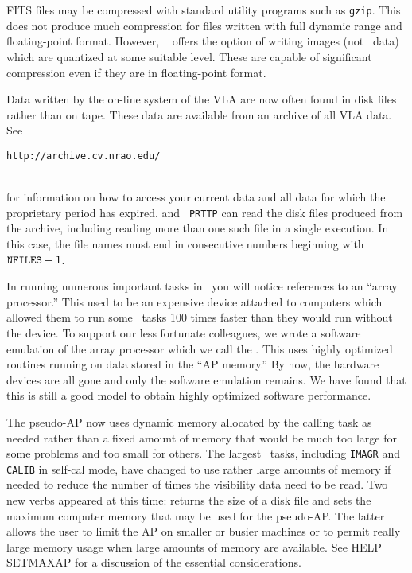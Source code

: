 FITS files may be compressed with standard utility programs such as
{\tt gzip}.  This does not produce much compression for files written
with full dynamic range and floating-point format.  However, {\tt
{}} offers the option of writing images (not \uv\ data)
which are quantized at some suitable level.  These are capable of
significant compression even if they are in floating-point format.


Data written by the on-line system of the VLA are now often found in
disk files rather than on tape.  These data are available from an
archive of all VLA data.  See \\
\centerline{{\tt http://archive.cv.nrao.edu/}}\\
for information on how to access your current data and all data for
which the proprietary period has expired.  {\tt {}} and {\tt
PRTTP} can read the disk files produced from the archive, including
reading more than one such file in a single execution.  In this case,
the file names must end in consecutive numbers beginning with ${\tt
NFILES}+1$\@.


In running numerous important tasks in \AIPS\ you will notice
references to an ``array processor.''  This used to be an expensive
device attached to computers which allowed them to run some \AIPS\
tasks 100 times faster than they would run without the device.  To
support our less fortunate colleagues, we wrote a software emulation
of the array processor which we call the .  This uses highly optimized routines running on data
stored in the ``AP memory.''  By now, the hardware devices are all
gone and only the software emulation remains.  We have found that this
is still a good model to obtain highly optimized software performance.

The pseudo-AP now uses dynamic memory allocated by the calling task as
needed rather than a fixed amount of memory that would be much too
large for some problems and too small for others.  The largest \AIPS\
tasks, including {\tt IMAGR} and {\tt CALIB} in self-cal mode, have
changed to use rather large amounts of memory if needed to reduce the
number of times the visibility data need to be read.  Two new verbs
appeared at this time: {\tt \Tndx{SIZEFILE}} returns the size of a
disk file and {\tt \Tndx{SETMAXAP}} sets the maximum computer memory
that may be used for the pseudo-AP\@.  The latter allows the user to
limit the AP on smaller or busier machines or to permit really large
memory usage when large amounts of memory are available.  See {\us
HELP SETMAXAP} for a discussion of the essential considerations.

